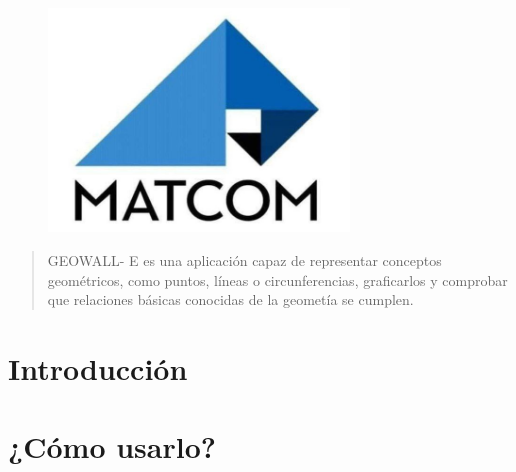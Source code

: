 \documentclass[a4paper, 12pt]{article}
\begin{document}
\begin{center}
\\
\vspace {2cm}
\\
\vspace {0.5cm}
\\
\vspace {0.5cm}
\\
\vspace {0.5cm}
\\
\vspace {10cm}
\begin{figure}[h]
       \center
       \includegraphics[width=8cm]{matcom.jpg}
\end{figure}
\end{center}

\newpage
\begin{abstract}
GEOWALL- E es una aplicación capaz de representar conceptos geométricos, como puntos, líneas o circunferencias, graficarlos y comprobar  que relaciones básicas conocidas de la geometía se cumplen.
\end{abstract}
\tableofcontents
\newpage

\section{Introducción}\label{sec;intro}



\newpage
\section{¿Cómo usarlo?}
\end{document}
